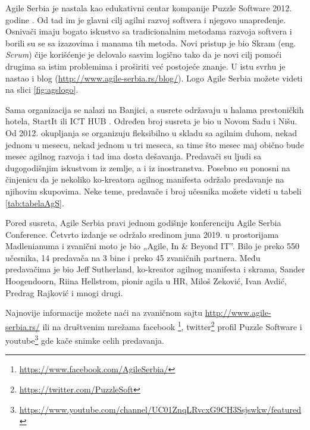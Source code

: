 \documentclass[a4paper]{article}
\begin{document}
{Agile Serbia je nastala kao edukativni centar kompanije Puzzle Software 2012. godine \cite{aboutAgS}. Od tad im je glavni cilj agilni razvoj softvera i njegovo unapređenje. Osnivači imaju bogato iskustvo sa tradicionalnim metodama razvoja softvera i borili su se sa izazovima i manama tih metoda. Novi pristup je bio Skram (eng. \textit{Scrum}) čije korišćenje je delovalo sasvim logično tako da je novi cilj pomoći drugima sa istim problemima i proširiti već postojeće znanje. U istu svrhu je nastao i blog (\url{http://www.agile-serbia.rs/blog/}). Logo Agile Serbia možete videti na slici \ref{fig:agslogo}.

Sama organizacija se nalazi na Banjici, a susrete održavaju u halama prestoničkih hotela, StartIt \cite{aboutStarit} ili ICT HUB \cite{aboutICT}. Određen broj susreta je bio u Novom Sadu i Nišu. Od 2012. okupljanja se organizuju fleksibilno u skladu sa agilnim duhom, nekad jednom u mesecu, nekad jednom u tri meseca, sa time što mesec maj obično bude mesec agilnog razvoja i tad ima dosta dešavanja. Predavači su ljudi sa dugogodišnjim iskustvom iz zemlje, a i iz inostranstva. Posebno su ponosni na činjenicu da je nekoliko ko-kreatora agilnog manifesta održalo predavanje na njihovim skupovima. Neke teme, predavače i broj učesnika možete videti u tabeli \ref{tab:tabelaAgS}.

Pored susreta, Agile Serbia pravi jednom godišnje konferenciju Agile Serbia Conference. Četvrto izdanje se održalo sredinom juna 2019. u prostorijama Madlenianuma i zvanični moto je bio „Agile, In \& Beyond IT''. Bilo je preko 550 učesnika, 14 predavača na 3 bine i preko 45 zvaničnih partnera. Među predavačima je bio Jeff Sutherland, ko-kreator agilnog manifesta i skrama, Sander Hoogendoorn, Riina Hellstrom, pionir agila u HR, Miloš Zeković, Ivan Avdić, Predrag Rajković i mnogi drugi.

Najnovije informacije možete naći na zvaničnom sajtu  \url{http://www.agile-serbia.rs/} ili na društvenim mrežama facebook \footnote{\url{https://www.facebook.com/AgileSerbia/}}, twitter\footnote{\url{https://twitter.com/PuzzleSoft}} profil Puzzle Software i youtube\footnote{\url{https://www.youtube.com/channel/UC01ZnqLRvcxG9CH3Ssjswkw/featured}} gde kače snimke celih predavanja.

}
\end{document}
